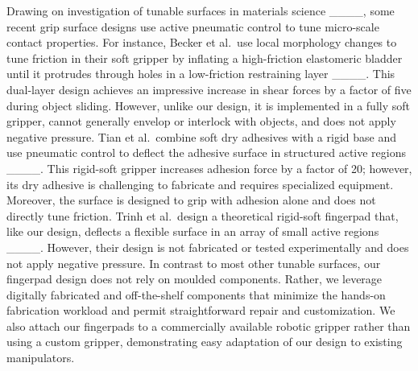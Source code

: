 Drawing on investigation of tunable surfaces in materials science ____, some recent grip surface designs use active pneumatic control to tune micro-scale contact properties.
%
For instance, Becker et al.\ use local morphology changes to tune friction in their soft gripper by inflating a high-friction elastomeric bladder until it protrudes through holes in a low-friction restraining layer ____.
%
This dual-layer design achieves an impressive increase in shear forces by a factor of five during object sliding. 
%
However, unlike our design, it is implemented in a fully soft gripper, cannot generally envelop or interlock with objects, and does not apply negative pressure. 
%
Tian et al.\ combine soft dry adhesives with a rigid base and use pneumatic control to deflect the adhesive surface in structured active regions ____. 
% 
This rigid-soft gripper increases adhesion force by a factor of 20; however, its dry adhesive is challenging to fabricate and requires specialized equipment. 
%
Moreover, the surface is designed to grip with adhesion alone and does not directly tune friction.
%
Trinh et al.\ design a theoretical rigid-soft fingerpad that, like our design, deflects a flexible surface in an array of small active regions ____. 
% 
However, their design is not fabricated or tested experimentally and does not apply negative pressure. 
%
In contrast to most other tunable surfaces, our fingerpad design does not rely on moulded components. 
%
Rather, we leverage digitally fabricated and off-the-shelf components that minimize the hands-on fabrication workload and permit straightforward repair and customization. 
%
We also attach our fingerpads to a commercially available robotic gripper rather than using a custom gripper, demonstrating easy adaptation of our design to existing manipulators.